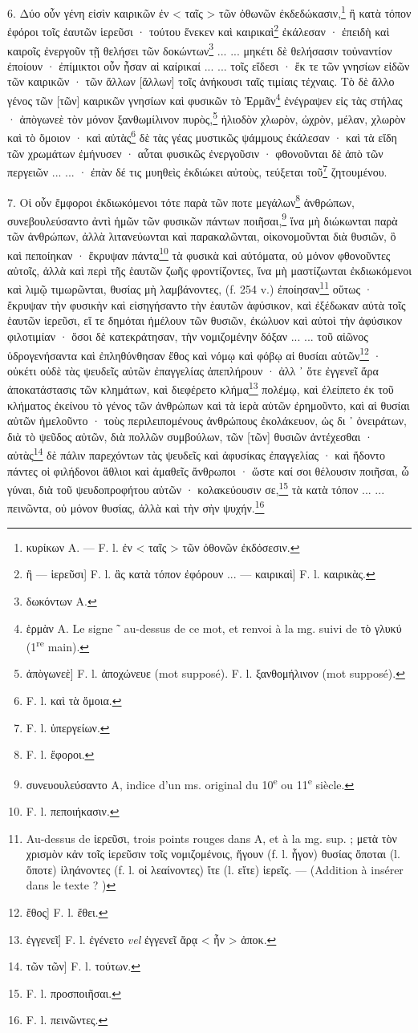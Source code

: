 \documentclass[a4paper, 11pt, oneside, polutonikogreek, french]{article}
\begin{document}
6. Δύο οὖν γένη εἰσὶν καιρικῶν ἐν < ταῖς > τῶν ὀθωνῶν ἐκδεδώκασιν,\footnote{κυρίκων A. --- F. l. ἐν < ταῖς > τῶν ὀθονῶν ἐκδόσεσιν.} ἢ κατὰ τόπον ἐφόροι τοῖς ἐαυτῶν ἱερεῦσι · τούτου ἕνεκεν καὶ καιρικαὶ\footnote{ἢ --- ἱερεῦσι] F. l. ἃς κατὰ τόπον ἐφόρουν ... --- καιρικαὶ] F. l. καιρικὰς.} ἐκάλεσαν · ἐπειδὴ καὶ καιροῖς ἐνεργοῦν τῇ θελήσει τῶν δοκώντων\footnote{δωκόντων A.} ... ... μηκέτι δὲ θελήσασιν τοὐναντίον ἐποίουν · ἐπίμικτοι οὖν ἦσαν αἱ καίρικαί ... ... τοῖς εἴδεσι · ἔκ τε τῶν γνησίων εἰδῶν τῶν καιρικῶν · τῶν ἄλλων [ἄλλων] τοῖς ἀνήκουσι ταῖς τιμίαις τέχναις. Τὸ δὲ ἄλλο γένος τῶν [τῶν] καιρικῶν γνησίων καὶ φυσικῶν τὸ Ἐρμᾶν\footnote{ἑρμὰν A. Le signe ῀ au-dessus de ce mot, et renvoi à la mg. suivi de τὸ γλυκύ (1\textsuperscript{re} main).} ἐνέγραψεν εἰς τὰς στήλας · ἀπὸγωνεὲ τὸν μόνον ξανθωμίλινον πυρὸς,\footnote{ἀπὸγωνεὲ] F. l. ἀποχώνευε (mot supposé). F. l. ξανθομήλινον (mot supposé).} ἡλιοδὸν χλωρὸν, ὠχρὸν, μέλαν, χλωρὸν καὶ τὸ ὅμοιον · καὶ αὐτὰς\footnote{F. l. καὶ τὰ ὅμοια.} δὲ τὰς γέας μυστικῶς ψάμμους ἐκάλεσαν · καὶ τὰ εἴδη τῶν χρωμάτων ἐμήνυσεν · αὗται φυσικῶς ἐνεργοῦσιν · φθονοῦνται δὲ ἀπὸ τῶν περγειῶν ... ... · ἐπὰν δέ τις μυηθεὶς ἐκδιώκει αὐτοὺς, τεύξεται τοῦ\footnote{F. l. ὑπεργείων.} ζητουμένου.

7. Οἱ οὖν ἔμφοροι ἐκδιωκόμενοι τότε παρὰ τῶν ποτε μεγάλων\footnote{F. l. ἔφοροι.} ἀνθρώπων, συνεβουλεύσαντο ἀντὶ ἡμῶν τῶν φυσικῶν πάντων ποιῆσαι,\footnote{συνευουλεύσαντο A, indice d'un ms. original du 10\textsuperscript{e} ou 11\textsuperscript{e} siècle.} ἵνα μὴ διώκωνται παρὰ τῶν ἀνθρώπων, ἀλλὰ λιτανεύωνται καὶ παρακαλῶνται, οἰκονομοῦνται διὰ θυσιῶν, ὃ καὶ πεποίηκαν · ἔκρυψαν πάντα\footnote{F. l. πεποιήκασιν.} τὰ φυσικὰ καὶ αὐτόματα, οὐ μόνον φθονοῦντες αὐτοῖς, ἀλλὰ καὶ περὶ τῆς ἑαυτῶν ζωῆς φροντίζοντες, ἵνα μὴ μαστίζωνται ἐκδιωκόμενοι καὶ λιμῷ τιμωρῶνται, θυσίας μὴ λαμβάνοντες, (f. 254 v.) ἐποίησαν\footnote{Au-dessus de ἱερεῦσι, trois points rouges dans A, et à la mg. sup. ; μετὰ τὸν χρισμὸν κἀν τοῖς ἱερεῦσιν τοῖς νομιζομένοις, ἥγουν (f. l. ἦγον) θυσίας ὅποται (l. ὅποτε) ἰληάνοντες (f. l. οἱ λεαίνοντες) ἴτε (l. εἴτε) ἱερεῖς. --- (Addition à insérer dans le texte ? )} οὕτως · ἔκρυψαν τὴν φυσικὴν καὶ εἰσηγήσαντο τὴν ἑαυτῶν ἀφύσικον, καὶ ἐξέδωκαν αὐτὰ τοῖς ἑαυτῶν ἱερεῦσι, εἴ τε δημόται ἠμέλουν τῶν θυσιῶν, ἐκώλυον καὶ αὐτοὶ τὴν ἀφύσικον φιλοτιμίαν · ὅσοι δὲ κατεκράτησαν, τὴν νομιζομένην δόξαν ... ... τοῦ αἰῶνος ὑδρογενήσαντα καὶ ἐπληθύνθησαν ἔθος καὶ νόμῳ καὶ φόβῳ αἱ θυσίαι αὐτῶν\footnote{ἔθος] F. l. ἔθει.} · οὐκέτι οὐδὲ τὰς ψευδεῖς αὐτῶν ἐπαγγελίας ἀπεπλήρουν · ἀλλ ᾽ ὅτε ἐγγενεῖ ἄρα ἀποκατάστασις τῶν κλημάτων, καὶ διεφέρετο κλήμα\footnote{ἐγγενεῖ] F. l. ἐγένετο \emph{vel} ἐγγενεῖ ἄρᾳ < ἦν > ἀποκ.} πολέμῳ, καὶ ἐλείπετο ἐκ τοῦ κλήματος ἐκείνου τὸ γένος τῶν ἀνθρώπων καὶ τὰ ἱερὰ αὐτῶν ἐρημοῦντο, καὶ αἱ θυσίαι αὐτῶν ἠμελοῦντο · τοὺς περιλειπομένους ἀνθρώπους ἐκολάκευον, ὡς δι ᾽ ὀνειράτων, διὰ τὸ ψεῦδος αὐτῶν, διὰ πολλῶν συμβούλων, τῶν [τῶν] θυσιῶν ἀντέχεσθαι · αὐτὰς\footnote{τῶν τῶν] F. l. τούτων.} δὲ πάλιν παρεχόντων τὰς ψευδεῖς καὶ ἀφυσίκας ἐπαγγελίας · καὶ ἥδοντο πάντες οἱ φιλήδονοι ἄθλιοι καὶ ἀμαθεῖς ἄνθρωποι · ὥστε καί σοι θέλουσιν ποιῆσαι, ὦ γύναι, διὰ τοῦ ψευδοπροφήτου αὐτῶν · κολακεύουσιν σε,\footnote{F. l. προσποιῆσαι.} τὰ κατὰ τόπον ... ... πεινῶντα, οὐ μόνον θυσίας, ἀλλὰ καὶ τὴν σὴν ψυχήν.\footnote{F. l. πεινῶντες.}
\end{document}
